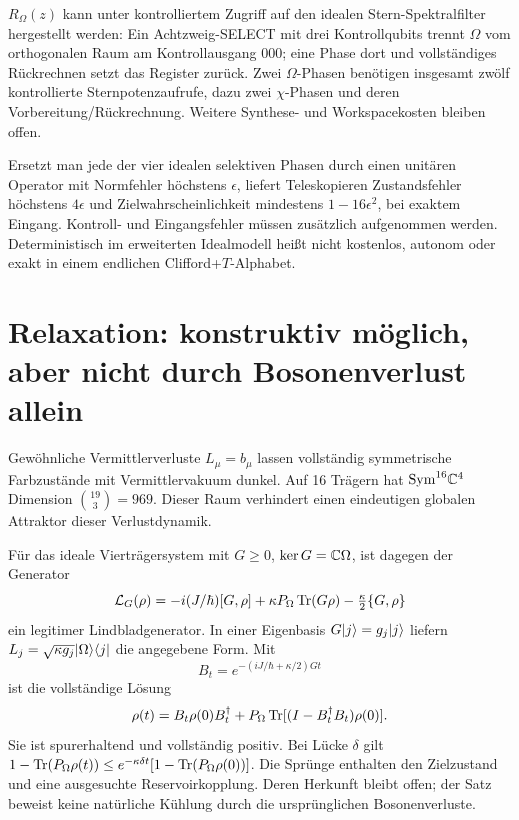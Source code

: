 $R_\Omega(z)$ kann unter kontrolliertem Zugriff auf den idealen Stern-Spektralfilter hergestellt werden: Ein Achtzweig-SELECT mit drei Kontrollqubits trennt $\Omega$ vom orthogonalen Raum am Kontrollausgang 000; eine Phase dort und vollständiges Rückrechnen setzt das Register zurück. Zwei $\Omega$-Phasen benötigen insgesamt zwölf kontrollierte Sternpotenzaufrufe, dazu zwei $\chi$-Phasen und deren Vorbereitung/Rückrechnung. Weitere Synthese- und Workspacekosten bleiben offen.

Ersetzt man jede der vier idealen selektiven Phasen durch einen unitären Operator mit Normfehler höchstens $\epsilon$, liefert Teleskopieren Zustandsfehler höchstens $4\epsilon$ und Zielwahrscheinlichkeit mindestens $1-16\epsilon^2$, bei exaktem Eingang. Kontroll- und Eingangsfehler müssen zusätzlich aufgenommen werden. Deterministisch im erweiterten Idealmodell heißt nicht kostenlos, autonom oder exakt in einem endlichen Clifford+$T$-Alphabet.

\section{Relaxation: konstruktiv möglich, aber nicht durch Bosonenverlust allein}
Gewöhnliche Vermittlerverluste $L_\mu=b_\mu$ lassen vollständig symmetrische Farbzustände mit Vermittlervakuum dunkel. Auf 16 Trägern hat $\mathrm{Sym}^{16}\mathbb C^4$ Dimension $\binom{19}{3}=969$. Dieser Raum verhindert einen eindeutigen globalen Attraktor dieser Verlustdynamik.

Für das ideale Vierträgersystem mit $G\ge0$, $\ker G=\mathbb C\Omega$, ist dagegen der Generator
\begin{equation}
\mathcal L_G(\rho)=-i(J/\hbar)[G,\rho]
+\kappa P_\Omega\operatorname{Tr}(G\rho)-\tfrac{\kappa}{2}\{G,\rho\}
\end{equation}
ein legitimer Lindbladgenerator. In einer Eigenbasis $G\lvert j\rangle=g_j\lvert j\rangle$ liefern $L_j=\sqrt{\kappa g_j}\lvert\Omega\rangle\langle j\rvert$ die angegebene Form. Mit
\begin{equation}
B_t=e^{-(iJ/\hbar+\kappa/2)Gt}
\end{equation}
ist die vollständige Lösung
\begin{equation}
\rho(t)=B_t\rho(0)B_t^\dagger+
P_\Omega\operatorname{Tr}[(I-B_t^\dagger B_t)\rho(0)].
\end{equation}
Sie ist spurerhaltend und vollständig positiv. Bei Lücke $\delta$ gilt
$1-\operatorname{Tr}(P_\Omega\rho(t))\le e^{-\kappa\delta t}[1-\operatorname{Tr}(P_\Omega\rho(0))]$.
Die Sprünge enthalten den Zielzustand und eine ausgesuchte Reservoirkopplung. Deren Herkunft bleibt offen; der Satz beweist keine natürliche Kühlung durch die ursprünglichen Bosonenverluste.

